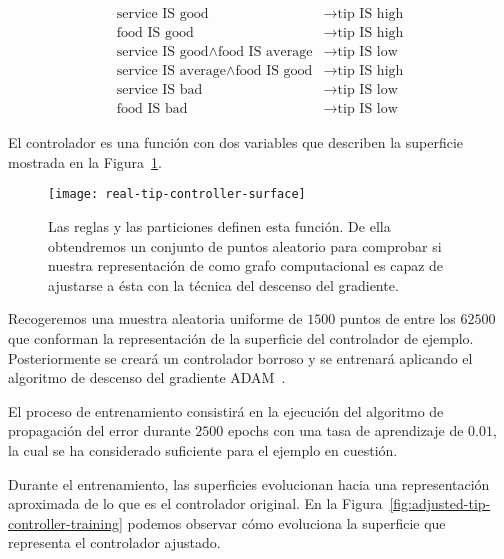 \begin{align}
\text{service IS good}                              &\rightarrow \text{tip IS high}\nonumber\\
\text{food IS good}                                 &\rightarrow \text{tip IS high}\nonumber\\
\text{service IS good} \land \text{food IS average} &\rightarrow \text{tip IS low}\nonumber\\
\text{service IS average} \land \text{food IS good} &\rightarrow \text{tip IS high}\nonumber\\
\text{service IS bad}                               &\rightarrow \text{tip IS low}\nonumber\\
\text{food IS bad}                                  &\rightarrow \text{tip IS low}
\end{align}

El controlador es una función con dos variables que describen la superficie mostrada en la Figura~\ref{fig:real-tip-controller-surface}.

\begin{figure}
	\centering
	\texttt{[image: real-tip-controller-surface]}
	\caption[Superficie de la función que modela el  de ejemplo]{Las reglas y las particiones definen esta función. De ella obtendremos un conjunto de puntos aleatorio para comprobar si nuestra representación de  como grafo computacional es capaz de ajustarse a ésta con la técnica del descenso del gradiente.}
	\label{fig:real-tip-controller-surface}
\end{figure}

Recogeremos una muestra aleatoria uniforme de $1500$ puntos de entre los $62500$ que conforman la representación de la superficie del controlador de ejemplo. Posteriormente se creará un controlador borroso y se entrenará aplicando el algoritmo de descenso del gradiente ADAM~\cite{kingma2014adam}.

El proceso de entrenamiento consistirá en la ejecución del algoritmo de propagación del error durante $2500$ epochs con una tasa de aprendizaje de $0.01$, la cual se ha considerado suficiente para el ejemplo en cuestión.

Durante el entrenamiento, las superficies evolucionan hacia una representación aproximada de lo que es el controlador original. En la Figura~\ref{fig:adjusted-tip-controller-training} podemos observar cómo evoluciona la superficie que representa el controlador ajustado.

